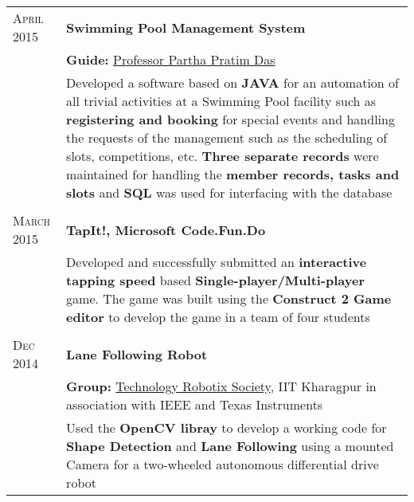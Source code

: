 \documentclass[a4paper,10pt]{extarticle} %
\begin{document}
\begin{tabular}{R{3.0cm}|p{15.0cm}}
\textsc{April 2015} & \textbf{Swimming Pool Management System}\\
& \textbf{Guide: }\textmd{\href{http://www.iitkgp.ac.in/fac-profiles/showprofile.php?empcode=SSmUZ}{Professor Partha Pratim Das}}\\
& \footnotesize{Developed a software based on \textbf{JAVA} for an automation of all trivial activities at a Swimming Pool facility such as \textbf{registering and booking} for special events and handling the requests of the management such as the scheduling of slots, competitions, etc. \textbf{Three separate records} were maintained for handling the \textbf{member records, tasks and slots} and \textbf{SQL} was used for interfacing with the database}\\
 \\

\textsc{March 2015} & \textbf{TapIt!, Microsoft Code.Fun.Do}\\
& \footnotesize{Developed and successfully submitted an \textbf{interactive tapping speed} based \textbf{Single-player/Multi-player} game. The game was built using the \textbf{Construct 2 Game editor} to develop the game in a team of four students}\\
 \\

\textsc{Dec 2014} & \textbf{Lane Following Robot} \\
& \textbf{Group: }\textmd{\href{http://www.robotix.in/}{Technology Robotix Society}}, IIT Kharagpur in association with IEEE and Texas Instruments\\
& \footnotesize{Used the \textbf{OpenCV libray} to develop a working code for \textbf{Shape Detection} and \textbf{Lane Following} using a mounted Camera for a two-wheeled autonomous differential drive robot}\\

\end{tabular}

\end{document}
